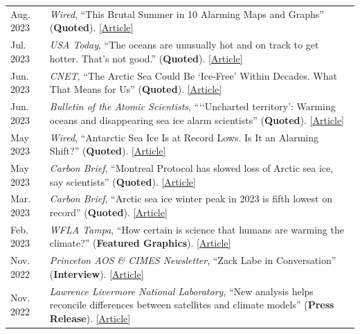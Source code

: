 \documentclass[margin,line,palatino,courier,10pt]{res}
\begin{document}
\begin{resume}
\begin{tabular}{@{}p{0.9in}p{4in}}
Aug. 2023 & \textit{Wired}, ``This Brutal Summer in 10 Alarming Maps and Graphs'' (\textbf{Quoted}). \href{https://www.wired.com/story/this-brutal-summer-in-10-alarming-maps-and-graphs/}{[Article]}\\
Jul. 2023 & \textit{USA Today}, ``The oceans are unusually hot and on track to get hotter. That’s not good.'' (\textbf{Quoted}). \href{https://www.usatoday.com/story/news/nation/2023/07/04/heat-waves-in-oceans-fueled-by-climate-change/70339174007/}{[Article]}\\
Jun. 2023 & \textit{CNET}, ``The Arctic Sea Could Be `Ice-Free' Within Decades. What That Means for Us'' (\textbf{Quoted}). \href{https://www.cnet.com/science/climate/the-arctic-sea-could-be-ice-free-within-decades-what-that-means-for-us/}{[Article]}\\
Jun. 2023 & \textit{Bulletin of the Atomic Scientists}, ```‘Uncharted territory': Warming oceans and disappearing sea ice alarm scientists'' (\textbf{Quoted}). \href{https://thebulletin.org/2023/06/uncharted-territory-warming-oceans-and-disappearing-sea-ice-alarm-scientists/}{[Article]}\\
May 2023 & \textit{Wired}, ``Antarctic Sea Ice Is at Record Lows. Is It an Alarming Shift?'' (\textbf{Quoted}). \href{https://www.wired.com/story/antarctic-sea-ice-is-at-record-lows-is-it-an-alarming-shift/}{[Article]}\\
May 2023 & \textit{Carbon Brief}, ``Montreal Protocol has slowed loss of Arctic sea ice, say scientists'' (\textbf{Quoted}). \href{https://www.carbonbrief.org/montreal-protocol-has-slowed-loss-of-arctic-sea-say-scientists/}{[Article]}\\
Mar. 2023 & \textit{Carbon Brief}, ``Arctic sea ice winter peak in 2023 is fifth lowest on record'' (\textbf{Quoted}). \href{https://www.carbonbrief.org/arctic-sea-ice-winter-peak-in-2023-is-fifth-lowest-on-record/}{[Article]}\\
Feb. 2023 & \textit{WFLA Tampa}, ``How certain is science that humans are warming the climate?'' (\textbf{Featured Graphics}). \href{https://www.wfla.com/weather/climate-classroom/how-certain-is-science-that-humans-are-warming-the-climate/}{[Article]}\\
Nov. 2022 & \textit{Princeton AOS \& CIMES Newsletter}, ``Zack Labe in Conversation'' (\textbf{Interview}). \href{https://aos.princeton.edu/sites/g/files/toruqf1176/files/documents/AOS\%20\%26\%20CIMES\%20Newsletter\%20Fall\%202022.pdf}{[Article]}\\
Nov. 2022 & \textit{Lawrence Livermore National Laboratory}, ``New analysis helps reconcile differences between satellites and climate models'' (\textbf{Press Release}). \href{https://www.llnl.gov/news/new-analysis-helps-reconcile-differences-between-satellites-climate-models}{[Article]}\\

\end{tabular}
\end{resume}
\end{document}
